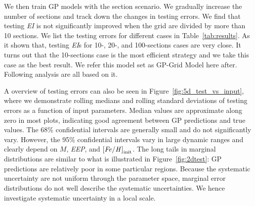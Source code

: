 We then train GP models with the section scenario. We gradually increase the number of sections and track down the changes in testing errors. 
We find that testing {\it EI} is not significantly improved when the grid are divided by more than 10 sections. We list the testing errors for different cases in Table~\ref{tab:results}. As it shown that, testing {\it EI}s for 10-, 20-, and 100-sections cases are very close. It turns out that the 10-sections case is the most efficient strategy and we take this case as the best result. We refer this model set as GP-Grid Model here after. Following analysis are all based on it. 

A overview of testing errors can also be seen in Figure~\ref{fig:5d_test_vs_input}, where we demonstrate rolling medians and rolling standard deviations of testing errors as a function of input parameters.
%
Median values are approximate along zero in most plots, indicating good agreement between GP predictions and true values.
%
The 68\% confidential intervals are generally small and do not significantly vary. However, the 95\% confidential intervals vary in large dynamic ranges and clearly depend on $M$, {\it EEP}, and $\rm {\it [Fe/H]}_{init}$. The long tails in marginal distributions are similar to what is illustrated in Figure~\ref{fig:2dtest}: GP predictions are relatively poor in some particular regions. Because the systematic uncertainty are not uniform through the parameter space, marginal error distributions do not well describe the systematic uncertainties. We hence investigate systematic uncertainty in a local scale. 

